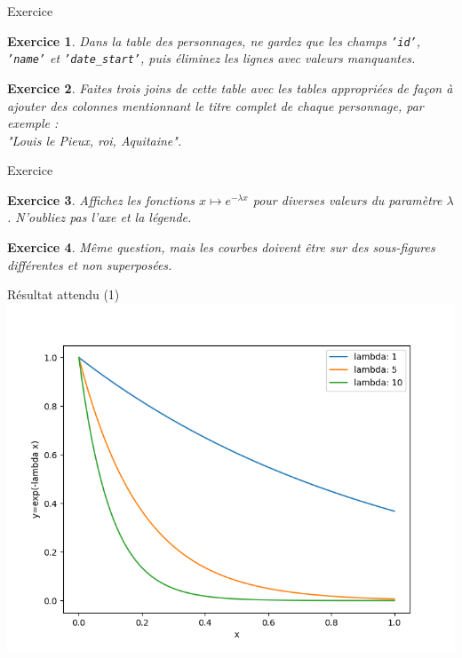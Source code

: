 \documentclass[11pt]{beamer}
\newtheorem{exercice}{Exercice}
\begin{document}
\begin{frame}{Exercice}
\begin{exercice}
Dans la table des personnages, ne gardez que les champs \texttt{'id'}, \texttt{'name'} et \texttt{'date\_start'}, puis éliminez les lignes avec valeurs manquantes.
\end{exercice}

\begin{exercice}
Faites trois joins de cette table avec les tables appropriées de façon à ajouter des colonnes mentionnant le titre complet de chaque personnage, par exemple :\\ 

\quad "Louis le Pieux, roi, Aquitaine".
\end{exercice}
\end{frame}

\begin{frame}{Exercice}
\begin{exercice}
Affichez les fonctions $x \mapsto e^{-\lambda x}$ pour diverses valeurs du paramètre $\lambda$. N'oubliez pas l'axe et la légende.
\end{exercice}

\begin{exercice}
Même question, mais les courbes doivent être sur des sous-figures différentes et non superposées.
\end{exercice}
\end{frame}

\begin{frame}{Résultat attendu (1)}
\includegraphics[scale=0.45]{ex201}
\end{frame}
\end{document}
